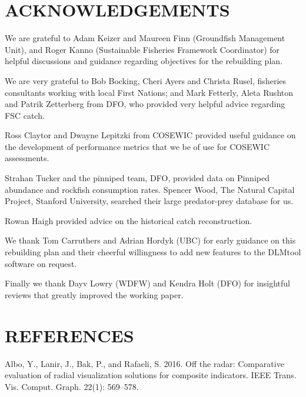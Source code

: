 \documentclass[11pt]{book}
\begin{document}
\clearpage

\hypertarget{acknowledgements}{%
\section{ACKNOWLEDGEMENTS}\label{acknowledgements}}

We are grateful to Adam Keizer and Maureen Finn (Groundfish Management Unit), and Roger Kanno (Sustainable Fisheries Framework Coordinator) for helpful discussions and guidance regarding objectives for the rebuilding plan.

We are very grateful to Bob Bocking, Cheri Ayers and Christa Rusel, fisheries consultants working with local First Nations; and Mark Fetterly, Aleta Rushton and Patrik Zetterberg from DFO, who provided very helpful advice regarding FSC catch.

Ross Claytor and Dwayne Lepitzki from COSEWIC provided useful guidance on the development of performance metrics that we be of use for COSEWIC assessments.

Strahan Tucker and the pinniped team, DFO, provided data on Pinniped abundance and rockfish consumption rates. Spencer Wood, The Natural Capital Project, Stanford University, searched their large predator-prey database for us.

Rowan Haigh provided advice on the historical catch reconstruction.

We thank Tom Carruthers and Adrian Hordyk (UBC) for early guidance on this rebuilding plan and their cheerful willingness to add new features to the DLMtool software on request.

Finally we thank Dayv Lowry (WDFW) and Kendra Holt (DFO) for insightful reviews that greatly improved the working paper.

\clearpage

\hypertarget{references}{%
\section{REFERENCES}\label{references}}

\noindent
\vspace{-2em}
\setlength{\parindent}{-0.2in}
\setlength{\leftskip}{0.2in}
\setlength{\parskip}{8pt}

\hypertarget{refs}{}
\leavevmode\hypertarget{ref-albo2016}{}%
Albo, Y., Lanir, J., Bak, P., and Rafaeli, S. 2016. Off the radar: Comparative evaluation of radial visualization solutions for composite indicators. IEEE Trans. Vis. Comput. Graph. 22(1): 569--578.
\end{document}
